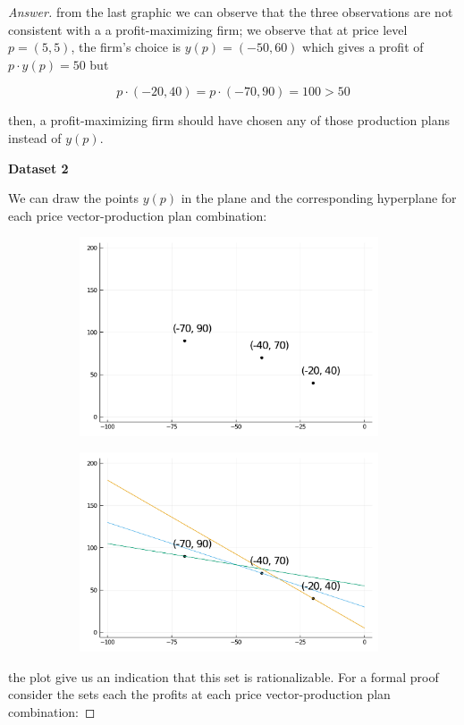 \documentclass{article}
\theoremstyle{definition}
\begin{document}
\begin{proof}[Answer]
from the last graphic we can observe that the three observations are not consistent with a a  profit-maximizing firm; we observe that at price level $p=(5,5)$, the firm's choice is $y(p) = (-50,60)$ which gives a profit of $p\cdot y(p) = 50$ but

$$p\cdot (-20, 40) = p\cdot (-70, 90) = 100 > 50 $$

then, a profit-maximizing firm should have chosen any of those production plans instead of $y(p)$.

\textbf{Dataset 2}

We can draw the points $y(p)$ in the plane and the corresponding hyperplane for each price vector-production plan combination:

\begin{figure}[!htbp]
  \centering
  \begin{subfigure}{0.45\textwidth}
    \includegraphics[width=0.97\textwidth]{Problem Set 1 Files/y_i_2.pdf}
  \end{subfigure}
  \hfill
  \begin{subfigure}{0.45\textwidth}
    \includegraphics[width=0.97\textwidth]{Problem Set 1 Files/y_o_2.pdf}
  \end{subfigure}
\end{figure}
the plot give us an indication that this set is rationalizable. For a formal proof consider the sets each the profits at each price vector-production plan combination:


\end{proof}
\end{document}
